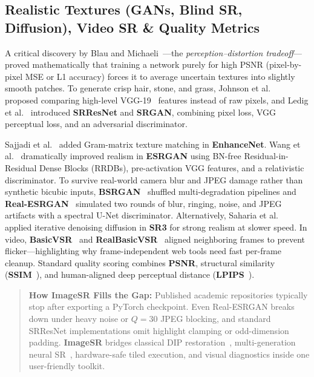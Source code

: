 \documentclass[10pt,onecolumn,journal]{IEEEtran}
\begin{document}
\subsection{Realistic Textures (GANs, Blind SR, Diffusion), Video SR \& Quality Metrics}
A critical discovery by Blau and Michaeli~\cite{blau2018tradeoff}---the \textit{perception--distortion tradeoff}---proved mathematically that training a network purely for high PSNR (pixel-by-pixel MSE or L1 accuracy) forces it to average uncertain textures into slightly smooth patches. To generate crisp hair, stone, and grass, Johnson et al.~\cite{johnson2016perceptual} proposed comparing high-level VGG-19~\cite{simonyan2015vgg} features instead of raw pixels, and Ledig et al.~\cite{ledig2017srgan} introduced \textbf{SRResNet} and \textbf{SRGAN}, combining pixel loss, VGG perceptual loss, and an adversarial discriminator.

Sajjadi et al.~\cite{sajjadi2017enhancenet} added Gram-matrix texture matching in \textbf{EnhanceNet}. Wang et al.~\cite{wang2018esrgan} dramatically improved realism in \textbf{ESRGAN} using BN-free Residual-in-Residual Dense Blocks (RRDBs), pre-activation VGG features, and a relativistic discriminator. To survive real-world camera blur and JPEG damage rather than synthetic bicubic inputs, \textbf{BSRGAN}~\cite{zhang2021bsrgan} shuffled multi-degradation pipelines and \textbf{Real-ESRGAN}~\cite{wang2021realesrgan} simulated two rounds of blur, ringing, noise, and JPEG artifacts with a spectral U-Net discriminator. Alternatively, Saharia et al.~\cite{saharia2023sr3} applied iterative denoising diffusion in \textbf{SR3} for strong realism at slower speed. In video, \textbf{BasicVSR}~\cite{chan2021basicvsr} and \textbf{RealBasicVSR}~\cite{chan2022realbasicvsr} aligned neighboring frames to prevent flicker---highlighting why frame-independent web tools need fast per-frame cleanup. Standard quality scoring combines \textbf{PSNR}, structural similarity (\textbf{SSIM}~\cite{wang2004ssim}), and human-aligned deep perceptual distance (\textbf{LPIPS}~\cite{zhang2018lpips}).

\begin{quote}
\textbf{How ImageSR Fills the Gap:} Published academic repositories typically stop after exporting a PyTorch checkpoint. Even Real-ESRGAN breaks down under heavy noise or $Q=30$ JPEG blocking, and standard SRResNet implementations omit highlight clamping or odd-dimension padding. \textbf{ImageSR} bridges classical DIP restoration~\cite{canny1986edge,zuiderveld1994clahe,tomasi1998bilateral,buades2005nlm}, multi-generation neural SR~\cite{dong2016srcnn,shi2016espcn,ledig2017srgan,wang2018esrgan,wang2021realesrgan}, hardware-safe tiled execution, and visual diagnostics inside one user-friendly toolkit.
\end{quote}
\end{document}
